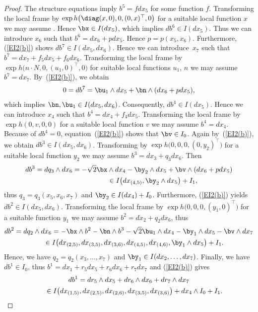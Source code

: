 \begin{proof} The structure equations imply $b^5=fdx_5$ for some function $f$. Transforming the local frame by $\exp h\big(\diag(x,0),0,(0,x)^\top,0\big)$ for a suitable local function $x$ we may assume . Hence $\bx\in I(dx_5)$, which implies $db^6\in I(dx_5)$. Thus we can introduce $x_6$ such that $b^6=dx_6 +p dx_5$. Hence $p=p(x_5,x_6)$. Furthermore, (\ref{EI2(b)}) shows $db^7\in I(dx_5, dx_6)$. Hence we can introduce~$x_7$ such that $b^7=dx_7+f_5 dx_5+f_6 dx_6$. Transforming the local frame by $\exp h\big(n\cdot N,0,(u_1,0)^\top,0\big)$ for suitable local functions $u_1$, $n$ we may assume $b^7=dx_7$. By~(\ref{EI2(b)}), we obtain
\begin{gather*}0=db^7=\bu_1\wedge dx_5 +\bn \wedge (dx_6+p dx_5),\end{gather*}
which implies $\bn, \bu_1\in I(dx_5,dx_6)$. Consequently, $db^4\in I(dx_5)$. Hence we can introduce $x_4$ such that $b^4=dx_4+f_4 dx_5$. Transforming the local frame by $\exp h(0,v,0,0)$ for a suitable local function $v$ we may assume $b^4=dx_4$. Because of $db^4=0$, equation~(\ref{EI2(b)}) shows that $\bv\in I_0$. Again by~(\ref{EI2(b)}), we obtain $db^3\in I(dx_5,dx_6)$. Transforming by $\exp h\big(0,0,0,(0,y_2)^\top\big)$ for a suitable local function $y_2$ we may assume $b^3=dx_3+q_3 dx_6$. Then
\begin{gather*}
db^3 = dq_3\wedge dx_6 = -\sqrt2 \bx\wedge dx_4-\by_2\wedge dx_5+\bv\wedge (dx_6+pdx_5)\\
\hphantom{db^3 = dq_3\wedge dx_6}{} \in I\big(dx_{(4,5)}, \by_2\wedge dx_5\big)+I_1,
\end{gather*}
thus $q_3=q_3(x_5,x_6,x_7)$ and $\by_2\in I(dx_4)+I_0$. Furthermore, (\ref{EI2(b)}) yields $db^2\in I(dx_5,dx_6)$. Transforming the local frame by $\exp h\big(0,0,0,(y_1,0)^\top\big)$ for a suitable function $y_1$ we may assume $b^2=dx_2+q_2 dx_6$, thus
\begin{gather*}
db^2 = dq_2\wedge dx_6 = -\bx\wedge b^2 -\bn \wedge b^3 -\sqrt2 \bu_1\wedge dx_4-\by_1\wedge dx_5-\bv\wedge dx_7\\
\hphantom{db^2}{} \in I\big(dx_{(2,5)}, dx_{(3,5)}, dx_{(3,6)}, dx_{(4,5)}, dx_{(4,6)}, \by_1\wedge dx_5\big)+I_1.
\end{gather*}
Hence, we have $q_2=q_2(x_3,\dots,x_7)$ and $\by_1\in I(dx_2,\dots,dx_7 )$. Finally, we have $db^1\in I_0$, thus $b^1=dx_1+r_5dx_5+r_6dx_6+r_7dx_7$ and (\ref{EI2(b)}) gives
\begin{gather*}
db^1 = dr_5\wedge dx_5+dr_6\wedge dx_6+dr_7\wedge dx_7\\
\hphantom{db^1}{} \in I\big( dx_{(1,5)}, dx_{(2,5)}, dx_{(2,6)}, dx_{(3,5)}, dx_{(3,6)} \big)+dx_4\wedge I_0 +I_1.
\end{gather*}


\end{proof}
